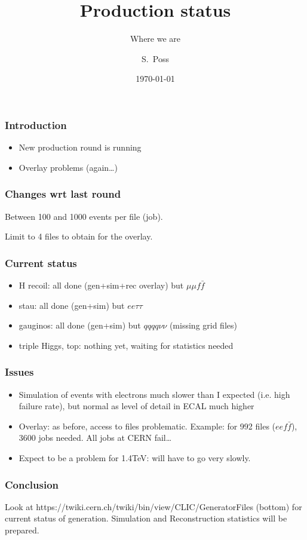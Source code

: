 \documentclass{beamer}
\title{Production status}
\subtitle{Where we are}
\author{S.~Poss}
\institute[CERN]
{%
CERN, Switzerland
}
\date{\today}
\begin{document}
\begin{frame}
\titlepage
\end{frame}

\begin{frame}
\frametitle{Introduction}
\begin{itemize}
  \item New production round is running
  \item Overlay problems (again\ldots)
\end{itemize}
\end{frame}

\begin{frame}
\frametitle{Changes wrt last round}
Between 100 and 1000 events per file (job). 

Limit to 4 files to obtain for the overlay.
\end{frame}

\begin{frame}
\frametitle{Current status}
\begin{itemize}
  \item H recoil: all done (gen+sim+rec overlay) but $\mu \mu f \bar{f}$ 
  \item stau: all done (gen+sim) but $ee\tau\tau$
  \item gauginos: all done (gen+sim) but $qqqq\nu\nu$ (missing grid files)
  \item triple Higgs, top: nothing yet, waiting for statistics needed
\end{itemize}
\end{frame}

\begin{frame}
\frametitle{Issues}
\begin{itemize}
  \item Simulation of events with electrons much slower than I expected (i.e.
  high failure rate), but normal as level of detail in ECAL much higher
  \item Overlay: as before, access to files problematic. Example: for 992
  files ($ee f \bar{f}$), 3600 jobs needed. All jobs at CERN fail\ldots
  \item Expect to be a problem for 1.4TeV: will have to go very slowly.
\end{itemize}
\end{frame}

\begin{frame}
\frametitle{Conclusion}
Look at https://twiki.cern.ch/twiki/bin/view/CLIC/GeneratorFiles (bottom) for
current status of generation. Simulation and Reconstruction statistics will be
prepared.

\end{frame}
\end{document}
